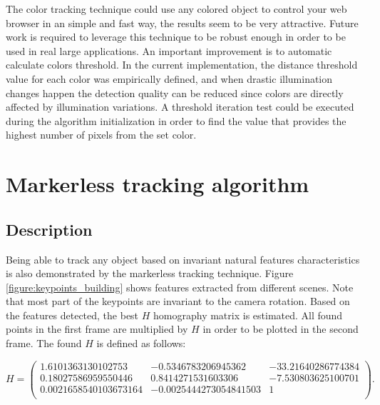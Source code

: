 The color tracking technique could use any colored object to control your web browser in an simple and fast way, the results seem to be very attractive. Future work is required to leverage this technique to be robust enough in order to be used in real large applications. An important improvement is to automatic calculate colors threshold. In the current implementation, the distance threshold value for each color was empirically defined, and when drastic illumination changes happen the detection quality can be reduced since colors are directly affected by illumination variations. A threshold iteration test could be executed during the algorithm initialization in order to find the value that provides the highest number of pixels from the set color.



\section{Markerless tracking algorithm} %
\label{sec:evaluation:markerless_tracking_algorithm}

\subsection{Description} %
\label{sub:evaluation:markerless_tracking_algorithm:description}

Being able to track any object based on invariant natural features characteristics is also demonstrated by the markerless tracking technique. Figure \ref{figure:keypoints_building} shows features extracted from different scenes. Note that most part of the keypoints are invariant to the camera rotation. Based on the features detected, the best $H$ homography matrix is estimated. All found points in the first frame are multiplied by $H$ in order to be plotted in the second frame. The found $H$ is defined as follows:

$$H=\begin{pmatrix}1.6101363130102753 & -0.5346783206945362 & -33.21640286774384\\ 0.18027586959550446 & 0.8414271531603306 & -7.530803625100701\\ 0.0021658540103673164 & -0.0025444273054841503 & 1\\\end{pmatrix}.$$

